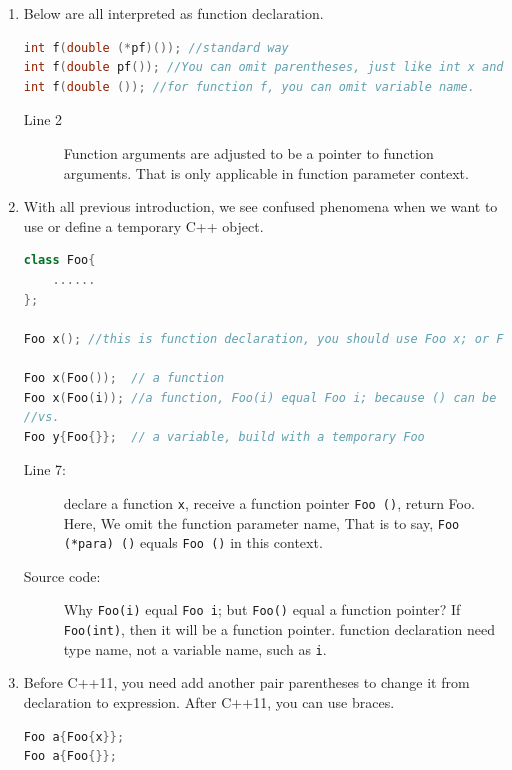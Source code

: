\documentclass[a4paper,11pt,twoside]{book}
\begin{document}
\begin{enumerate}
	\item Below are all interpreted as function declaration. 
\begin{lstlisting}[frame=single, language=c++, mathescape=true]
int f(double (*pf)()); //standard way
int f(double pf()); //You can omit parentheses, just like int x and int (x);
int f(double ()); //for function f, you can omit variable name.
\end{lstlisting}
\begin{description}
    \item[Line 2] Function arguments are adjusted to be a pointer to function arguments. That is only applicable in function parameter context. 
\end{description}

	\item With all previous introduction, we see confused phenomena when we want to use or define a temporary C++ object. 
\begin{lstlisting}[frame=single, language=c++]
class Foo{
	......
};
	
Foo x(); //this is function declaration, you should use Foo x; or Foo x{};
	
Foo x(Foo());  // a function
Foo x(Foo(i)); //a function, Foo(i) equal Foo i; because () can be omitted by a compiler.
//vs.
Foo y{Foo{}};  // a variable, build with a temporary Foo
\end{lstlisting}
\begin{description}
	\item[Line 7:] declare a function \texttt{x}, receive a function pointer \texttt{Foo ()}, return Foo. Here, We omit the function parameter name, That is to say,  \texttt{Foo (*para) ()}  equals \texttt{Foo  ()} in this context.
	
	\item[Source code:]  Why \texttt{Foo(i)} equal \texttt{Foo i}; but \texttt{Foo()} equal a function pointer? If \texttt{Foo(int)}, then it will be a function pointer.  function declaration need type name, not a variable name, such as \texttt{i}.	
\end{description}

	\item Before C++11, you need add another pair parentheses to change it from declaration to expression. After C++11, you can use braces.
\begin{lstlisting}[frame=single, language=c++, mathescape=true]
Foo a{Foo{x}}; 
Foo a{Foo{}};
\end{lstlisting} 


\end{enumerate}
\end{document}
